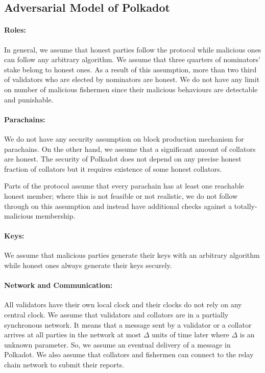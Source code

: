 \documentclass{article}
\newcommand{\D}{\ensuremath{\Delta}}
\begin{document}
\subsection{Adversarial Model of Polkadot}\label{sec:security_model}

\paragraph{Roles:} In general, we assume that honest parties follow the protocol while malicious ones can follow any arbitrary algorithm. We assume that three quarters of nominators' stake belong to honest ones. As a result of this assumption, more than two third of validators who are elected by nominators are honest. We do not have any limit on number of malicious fishermen since their malicious behaviours are detectable and punishable.

\paragraph{Parachains:} We do not have any security assumption on block production mechanism for parachains. On the other hand, we assume that a significant amount of collators are honest. The security of Polkadot does not depend on any precise honest fraction of collators but it requires existence of some honest collators.

Parts of the protocol assume that every parachain has at least one reachable honest member; where this is not feasible or not realistic, we do not follow through on this assumption and instead have additional checks against a totally-malicious membership.

\paragraph{Keys:} We assume that malicious parties generate their keys with an arbitrary algorithm
while honest ones always generate their keys securely.

\paragraph{Network and Communication:} \label{par:network_coms} All validators have their own local clock and their clocks do not rely on any central clock.
We assume that  validators and collators are in a partially synchronous network.
It means that a message sent by a validator or a collator arrives at all parties in the network
at most $\D$ units of time later where $\D$ is an unknown parameter. So, we assume an eventual delivery of a message in Polkadot.
We also assume that collators and fishermen can connect to the relay chain network to submit their reports.
\end{document}
